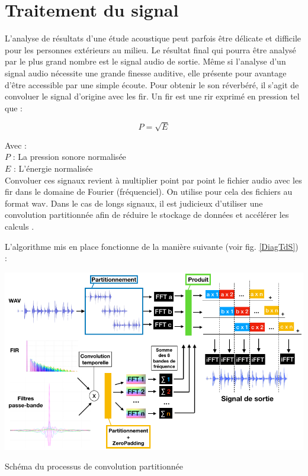 \section{Traitement du signal} \label{sect_TDS}

L'analyse de résultats d'une étude acoustique peut parfois être délicate et difficile pour les personnes extérieurs au milieu. Le résultat final qui pourra être analysé par le plus grand nombre est le signal audio de sortie. Même si l'analyse d'un signal audio nécessite une grande finesse auditive, elle présente pour avantage d'être accessible par une simple écoute. Pour obtenir le son réverbéré, il s'agit de convoluer le signal d'origine avec les \gls{fir}. Un \gls{fir} est une \gls{rir} exprimé en pression tel que :

\begin{equation}
P = \sqrt{E}
\end{equation}

Avec : \\
$P$ : La pression sonore normalisée \\
$E$ : L'énergie normalisée \\

Convoluer ces signaux revient à multiplier point par point le fichier audio avec les \gls{fir} dans le domaine de Fourier (fréquenciel).
On utilise pour cela des fichiers au format \gls{wav}. Dans le cas de longs signaux, il est judicieux d'utiliser une convolution partitionnée afin de réduire le stockage de données et accélérer les calculs \cite[2. Algorithm overview ]{partition}. 

L'algorithme mis en place fonctionne de la manière suivante (voir fig. \ref{DiagTdS}) :
\begin{figureth}
	\includegraphics[width=\linewidth]{images/DiagTdS}
	\caption{Schéma du processus de convolution partitionnée}
	\label{DiagTdS}
\end{figureth}

